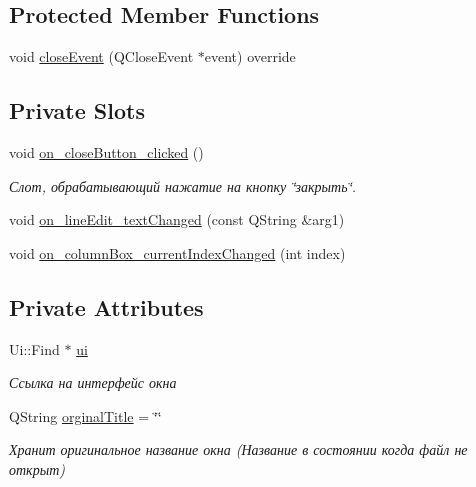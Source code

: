 \subsection*{Protected Member Functions}
\begin{DoxyCompactItemize}
\item 
void \mbox{\hyperlink{class_find_a9d214f69abd560f8558da6cc316de5c6}{close\+Event}} (Q\+Close\+Event $\ast$event) override
\end{DoxyCompactItemize}
\subsection*{Private Slots}
\begin{DoxyCompactItemize}
\item 
\mbox{\label{class_find_ae94828b8205c318072270a7c1e1aa694}} 
void \mbox{\hyperlink{class_find_ae94828b8205c318072270a7c1e1aa694}{on\+\_\+close\+Button\+\_\+clicked}} ()
\begin{DoxyCompactList}\small\item\em Слот, обрабатывающий нажатие на кнопку \char`\"{}закрыть\char`\"{}. \end{DoxyCompactList}\item 
void \mbox{\hyperlink{class_find_a4fe6e569e642cd268783ddc8746d665d}{on\+\_\+line\+Edit\+\_\+text\+Changed}} (const Q\+String \&arg1)
\item 
void \mbox{\hyperlink{class_find_a3acea10ee973c2de1983dd2657b66a89}{on\+\_\+column\+Box\+\_\+current\+Index\+Changed}} (int index)
\end{DoxyCompactItemize}
\subsection*{Private Attributes}
\begin{DoxyCompactItemize}
\item 
\mbox{\label{class_find_ac4a8425d2386b32cb5f0a7aa0b6a88c2}} 
Ui\+::\+Find $\ast$ \mbox{\hyperlink{class_find_ac4a8425d2386b32cb5f0a7aa0b6a88c2}{ui}}
\begin{DoxyCompactList}\small\item\em Ссылка на интерфейс окна \end{DoxyCompactList}\item 
\mbox{\label{class_find_a7151a53dfa03d4e3158c740414024671}} 
Q\+String \mbox{\hyperlink{class_find_a7151a53dfa03d4e3158c740414024671}{orginal\+Title}} = \char`\"{}\char`\"{}
\begin{DoxyCompactList}\small\item\em Хранит оригинальное название окна (Название в состоянии когда файл не открыт) \end{DoxyCompactList}\end{DoxyCompactItemize}


